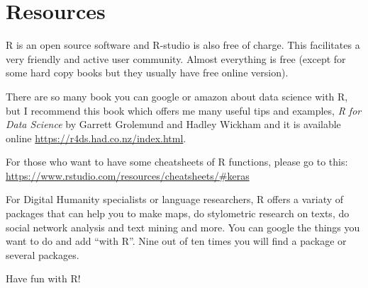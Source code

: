 \documentclass[]{book}
\begin{document}
\chapter{Resources}\label{resources}

R is an open source software and R-studio is also free of charge. This
facilitates a very friendly and active user community. Almost everything
is free (except for some hard copy books but they usually have free
online version).

There are so many book you can google or amazon about data science with
R, but I recommend this book which offers me many useful tips and
examples, \emph{R for Data Science} by Garrett Grolemund and Hadley
Wickham and it is available online
\url{https://r4ds.had.co.nz/index.html}.

For those who want to have some cheatsheets of R functions, please go to
this: \url{https://www.rstudio.com/resources/cheatsheets/\#keras}

For Digital Humanity specialists or language researchers, R offers a
variaty of packages that can help you to make maps, do stylometric
research on texts, do social network analysis and text mining and more.
You can google the things you want to do and add ``with R''. Nine out of
ten times you will find a package or several packages.

Have fun with R!


\end{document}
